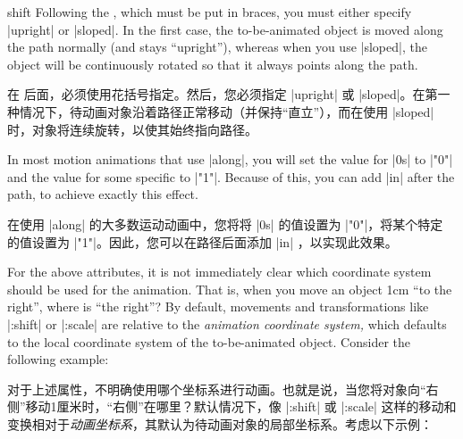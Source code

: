 \begin{tikzanimateattribute}{shift}
    Following the , which must be put in braces, you must either
    specify |upright| or |sloped|. In the first case, the to-be-animated object
    is moved along the path normally (and stays ``upright''), whereas when you
    use |sloped|, the object will be continuously rotated so that it always
    points along the path.
    
    在 后面，必须使用花括号指定。然后，您必须指定 |upright| 或 |sloped|。在第一种情况下，待动画对象沿着路径正常移动（并保持“直立”），而在使用 |sloped| 时，对象将连续旋转，以使其始终指向路径。


\begin{codeexample}[
    preamble={\usetikzlibrary{animations}},
    animation list={0.5,1,1.5,2},
]
\end{codeexample}

    In most motion animations that use |along|, you will set the value for |0s|
    to |"0"| and the value for some specific  to |"1"|. Because of
    this, you can add |in|  after the path, to achieve exactly this
    effect.

    在使用 |along| 的大多数运动动画中，您将将 |0s| 的值设置为 |"0"|，将某个特定 的值设置为 |"1"|。因此，您可以在路径后面添加 |in| ，以实现此效果。


\end{tikzanimateattribute}

For the above attributes, it is not immediately clear which coordinate system
should be used for the animation. That is, when you move an object 1cm ``to the
right'', where is ``the right''? By default, movements and transformations like
|:shift| or |:scale| are relative to the \emph{animation coordinate system,}
which defaults to the local coordinate system of the to-be-animated object.
Consider the following example:

对于上述属性，不明确使用哪个坐标系进行动画。也就是说，当您将对象向“右侧”移动1厘米时，“右侧”在哪里？默认情况下，像 |:shift| 或 |:scale| 这样的移动和变换相对于\emph{动画坐标系}，其默认为待动画对象的局部坐标系。考虑以下示例：


